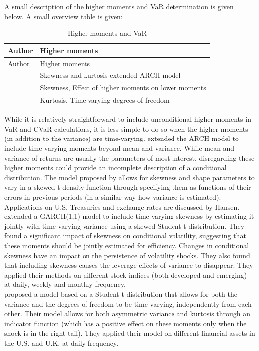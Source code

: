 \documentclass[a4paper, nobind]{templates/ociamthesis}
\begin{document}
A small description of the higher moments and VaR determination is given below. A small overview table is given:

\begin{longtable}[]{@{}ll@{}}
\caption{Higher moments and VaR}\tabularnewline
\toprule
Author & Higher moments\tabularnewline
\midrule
\endfirsthead
\toprule
Author & Higher moments\tabularnewline
\midrule
\endhead
\textcite{hansen1994} & Skewness and kurtosis extended ARCH-model\tabularnewline
\textcite{harvey1999} & Skewness, Effect of higher moments on lower moments\tabularnewline
\textcite{brooks2005} & Kurtosis, Time varying degrees of freedom\tabularnewline
\bottomrule
\end{longtable}

\noindent While it is relatively straightforward to include unconditional higher-moments in VaR and CVaR calculations, it is less simple to do so when the higher moments (in addition to the variance) are time-varying. \textcite{hansen1994} extended the ARCH model to include time-varying moments beyond mean and variance. While mean and variance of returns are usually the parameters of most interest, disregarding these higher moments could provide an incomplete description of a conditional distribution. The model proposed by \textcite{hansen1994} allows for skewness and shape parameters to vary in a skewed-t density function through specifying them as functions of their errors in previous periods (in a similar way how variance is estimated). Applications on U.S. Treasuries and exchange rates are discussed by Hansen.~\\

\noindent \textcite{harvey1999} extended a GARCH(1,1) model to include time-varying skewness by estimating it jointly with time-varying variance using a skewed Student-t distribution. They found a significant impact of skewness on conditional volatility, suggesting that these moments should be jointly estimated for efficiency. Changes in conditional skewness have an impact on the persistence of volatility shocks. They also found that including skewness causes the leverage effects of variance to disappear. They applied their methods on different stock indices (both developed and emerging) at daily, weekly and monthly frequency.~\\

\noindent \textcite{brooks2005} proposed a model based on a Student-t distribution that allows for both the variance and the degrees of freedom to be time-varying, independently from each other. Their model allows for both asymmetric variance and kurtosis through an indicator function (which has a positive effect on these moments only when the shock is in the right tail). They applied their model on different financial assets in the U.S. and U.K. at daily frequency.
\end{document}
